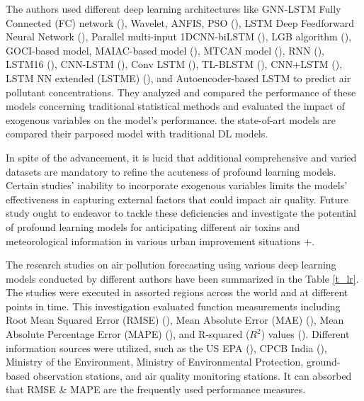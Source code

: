 \documentclass[a4paper,fleqn]{cas-dc}
\begin{document}
The authors used different deep learning architectures like GNN-LSTM Fully Connected (FC) network (\cite{li2023nested}), Wavelet, ANFIS, PSO (\cite{pruthi2022low}), LSTM Deep Feedforward Neural Network (\cite{menares2021forecasting}), Parallel multi-input 1DCNN-biLSTM (\cite{zhu2023deep}), LGB algorithm (\cite{kim2022short}), GOCI-based model, MAIAC-based model (\cite{lee2021potential}), MTCAN model (\cite{samal2021multi}), RNN (\cite{kurnaz2022prediction}), LSTM16 (\cite{das2022prediction}), CNN-LSTM (\cite{natsagdorj2023prediction}), Conv LSTM (\cite{zhu2023deep}), TL-BLSTM (\cite{ma2019improving}), CNN+LSTM (\cite{qin2019novel}), LSTM NN extended (LSTME) (\cite{li2017long}), and Autoencoder-based LSTM to predict air pollutant concentrations. They analyzed and compared the performance of these models concerning traditional statistical methods and evaluated the impact of exogenous variables on the model's performance. the state-of-art models are compared their parposed model with traditional DL models.

In spite of the advancement, it is lucid that additional comprehensive and varied datasets are mandatory to refine the acuteness of profound learning models. Certain studies' inability to incorporate exogenous variables limits the models' effectiveness in capturing external factors that could impact air quality. Future study ought to endeavor to tackle these deficiencies and investigate the potential of profound learning models for anticipating different air toxins and meteorological information in various urban improvement situations $+$.

The research studies on air pollution forecasting using various deep learning models conducted by different authors have been summarized in the Table \ref{t_lr}. The studies were executed in assorted regions across the world and at different points in time. This investigation evaluated function measurements including Root Mean Squared Error (RMSE) (\cite{das2022prediction,kurnaz2022prediction,samal2021multi,kim2022short,zhu2023investigation,menares2021forecasting,nath2021long,du2019deep,li2017long,qin2019novel,ma2019improving,natsagdorj2023prediction}), Mean Absolute Error (MAE) (\cite{li2023nested,menares2021forecasting,zhu2023investigation,ma2019improving,nath2021long,du2019deep,li2017long}), Mean Absolute Percentage Error (MAPE) (\cite{li2017long,ma2019improving}), and R-squared ($R^2$) values (\cite{eren2023predicting,lee2021potential,kim2022short,zhu2023investigation,menares2021forecasting}). Different information sources were utilized, such as the US EPA (\cite{li2023nested}), CPCB India (\cite{nath2021long,samal2021multi,pruthi2022low}), Ministry of the Environment, Ministry of Environmental Protection, ground-based observation stations, and air quality monitoring stations. It can absorbed that RMSE \& MAPE are the frequently used performance measures.
 
\end{document}
